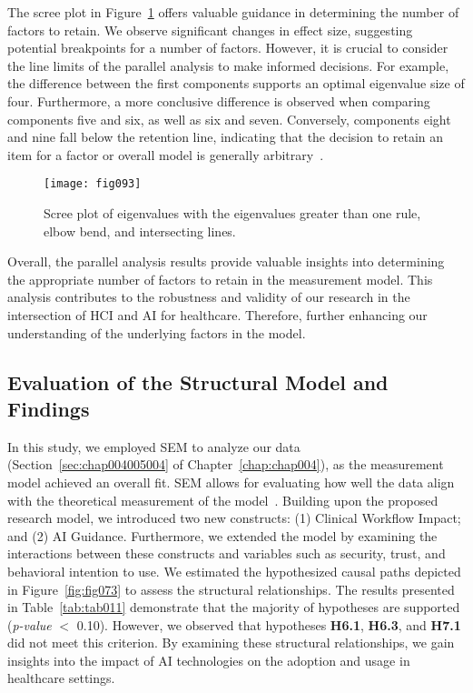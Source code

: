 The scree plot in Figure~\ref{fig:fig093} offers valuable guidance in determining the number of factors to retain.
We observe significant changes in effect size, suggesting potential breakpoints for a number of factors.
However, it is crucial to consider the line limits of the parallel analysis to make informed decisions.
For example, the difference between the first components supports an optimal eigenvalue size of four.
Furthermore, a more conclusive difference is observed when comparing components five and six, as well as six and seven.
Conversely, components eight and nine fall below the retention line, indicating that the decision to retain an item for a factor or overall model is generally arbitrary~\cite{CALISTO2022102922}.

\begin{figure}[htpb]
\centering
\texttt{[image: fig093]}
\caption{Scree plot of eigenvalues with the eigenvalues greater than one rule, elbow bend, and intersecting lines.}
\label{fig:fig093}
\end{figure}

Overall, the parallel analysis results provide valuable insights into determining the appropriate number of factors to retain in the measurement model.
This analysis contributes to the robustness and validity of our research in the intersection of \ac{HCI} and \ac{AI} for healthcare.
Therefore, further enhancing our understanding of the underlying factors in the model.

\subsection{Evaluation of the Structural Model and Findings}
\label{chap:app002004004}

In this study, we employed \ac{SEM} to analyze our data (Section~\ref{sec:chap004005004} of Chapter~\ref{chap:chap004}), as the measurement model achieved an overall fit.
\ac{SEM} allows for evaluating how well the data align with the theoretical measurement of the model~\cite{doi:10.1080/10705511.2017.1401932}.
Building upon the proposed research model, we introduced two new constructs:
(1) Clinical Workflow Impact; and
(2) \ac{AI} Guidance.
Furthermore, we extended the model by examining the interactions between these constructs and variables such as security, trust, and behavioral intention to use.
We estimated the hypothesized causal paths depicted in Figure~\ref{fig:fig073} to assess the structural relationships.
The results presented in Table~\ref{tab:tab011} demonstrate that the majority of hypotheses are supported ({\it p-value} $<$ 0.10).
However, we observed that hypotheses {\bf H6.1}, {\bf H6.3}, and {\bf H7.1} did not meet this criterion.
By examining these structural relationships, we gain insights into the impact of \ac{AI} technologies on the adoption and usage in healthcare settings.

